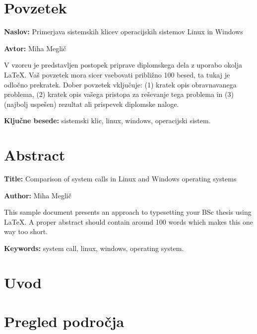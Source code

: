 \documentclass[a4paper,12pt,openright]{book}
\newcommand{\ttitle}{Primerjava sistemskih klicev operacijskih sistemov Linux in Windows}
\newcommand{\ttitleEn}{Comparison of system calls in Linux and Windows operating systems}
\newcommand{\tauthor}{Miha Meglič}
\newcommand{\tkeywords}{sistemski klic, linux, windows, operacijski sistem}
\newcommand{\tkeywordsEn}{system call, linux, windows, operating system}
\newcommand{\clearemptydoublepage}{\newpage{\pagestyle{empty}\cleardoublepage}}
\begin{document}
\clearemptydoublepage

\chapter*{Povzetek}

\noindent\textbf{Naslov:} \ttitle
\bigskip

\noindent\textbf{Avtor:} \tauthor
\bigskip

\noindent V vzorcu je predstavljen postopek priprave diplomskega dela z uporabo okolja \LaTeX. Vaš povzetek mora sicer vsebovati približno 100 besed, ta tukaj je odločno prekratek.
Dober povzetek vključuje: (1) kratek opis obravnavanega problema, (2) kratek opis vašega pristopa za reševanje tega problema in (3) (najbolj uspešen) rezultat ali prispevek diplomske naloge.

\bigskip

\noindent\textbf{Ključne besede:} \tkeywords.
\clearemptydoublepage

\chapter*{Abstract}

\noindent\textbf{Title:} \ttitleEn
\bigskip

\noindent\textbf{Author:} \tauthor
\bigskip

\noindent This sample document presents an approach to typesetting your BSc thesis using \LaTeX. 
A proper abstract should contain around 100 words which makes this one way too short.
\bigskip

\noindent\textbf{Keywords:} \tkeywordsEn.
\clearemptydoublepage

\mainmatter
\setcounter{page}{1}
\pagestyle{fancy}

\chapter{Uvod}


\chapter{Pregled področja}
\end{document}
